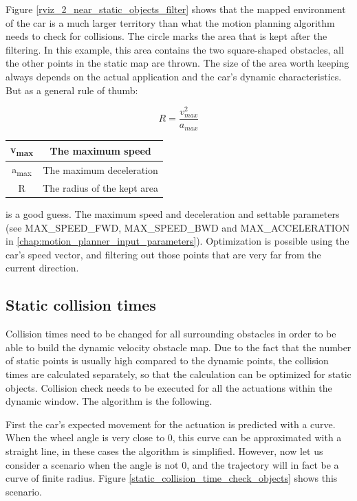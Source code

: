 Figure \ref{rviz_2_near_static_objects_filter} shows that the mapped environment of the car is a much larger territory than what the motion planning algorithm needs to check for collisions. The circle marks the area that is kept after the filtering. In this example, this area contains the two square-shaped obstacles, all the other points in the static map are thrown. The size of the area worth keeping always depends on the actual application and the car's dynamic characteristics. But as a general rule of thumb:

\[ R = \frac{v_{max}^2}{a_{max}} \]

\begin{center}
    \begin{tabular}{ | c | c | }
        \hline
        v\textsubscript{max}	& The maximum speed   			\\
        \hline
        a\textsubscript{max}  	& The maximum deceleration      \\
        \hline
        R  						& The radius of the kept area	\\
        \hline
    \end{tabular}
\end{center}

is a good guess. The maximum speed and deceleration and settable parameters (see MAX\_SPEED\_FWD, MAX\_SPEED\_BWD and MAX\_ACCELERATION in \ref{chap:motion_planner_input_parameters}). Optimization is possible using the car's speed vector, and filtering out those points that are very far from the current direction.

\subsection{Static collision times}
Collision times need to be changed for all surrounding obstacles in order to be able to build the dynamic velocity obstacle map. Due to the fact that the number of static points is usually high compared to the dynamic points, the collision times are calculated separately, so that the calculation can be optimized for static objects. Collision check needs to be executed for all the actuations within the dynamic window. The algorithm is the following.

First the car's expected movement for the actuation is predicted with a curve. When the wheel angle is very close to 0, this curve can be approximated with a straight line, in these cases the algorithm is simplified. However, now let us consider a scenario when the angle is not 0, and the trajectory will in fact be a curve of finite radius. Figure \ref{static_collision_time_check_objects} shows this scenario.

